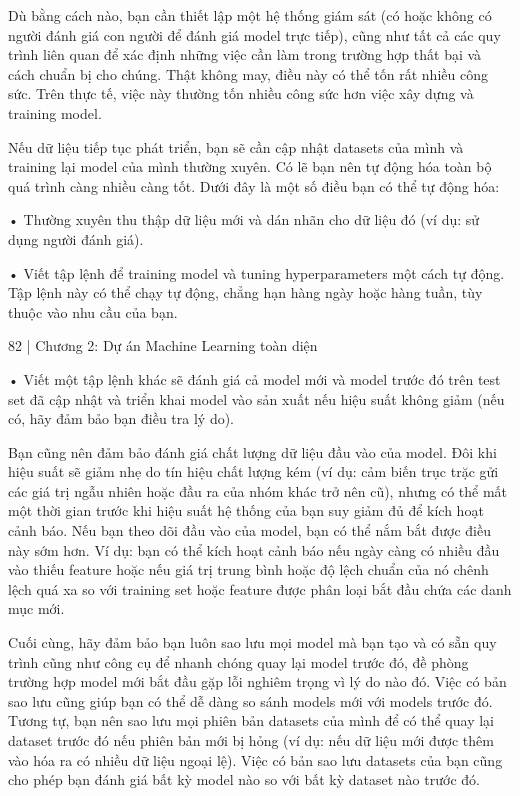 Dù bằng cách nào, bạn cần thiết lập một hệ thống giám sát (có hoặc không có người đánh giá con người để đánh giá model trực tiếp), cũng như tất cả các quy trình liên quan để xác định những việc cần làm trong trường hợp thất bại và cách chuẩn bị cho chúng. Thật không may, điều này có thể tốn rất nhiều công sức. Trên thực tế, việc này thường tốn nhiều công sức hơn việc xây dựng và training model.

Nếu dữ liệu tiếp tục phát triển, bạn sẽ cần cập nhật datasets của mình và training lại model của mình thường xuyên. Có lẽ bạn nên tự động hóa toàn bộ quá trình càng nhiều càng tốt. Dưới đây là một số điều bạn có thể tự động hóa:

• Thường xuyên thu thập dữ liệu mới và dán nhãn cho dữ liệu đó (ví dụ: sử dụng người đánh giá).

• Viết tập lệnh để training model và tuning hyperparameters một cách tự động. Tập lệnh này có thể chạy tự động, chẳng hạn hàng ngày hoặc hàng tuần, tùy thuộc vào nhu cầu của bạn.

82 | Chương 2: Dự án Machine Learning toàn diện

• Viết một tập lệnh khác sẽ đánh giá cả model mới và model trước đó trên test set đã cập nhật và triển khai model vào sản xuất nếu hiệu suất không giảm (nếu có, hãy đảm bảo bạn điều tra lý do).

Bạn cũng nên đảm bảo đánh giá chất lượng dữ liệu đầu vào của model. Đôi khi hiệu suất sẽ giảm nhẹ do tín hiệu chất lượng kém (ví dụ: cảm biến trục trặc gửi các giá trị ngẫu nhiên hoặc đầu ra của nhóm khác trở nên cũ), nhưng có thể mất một thời gian trước khi hiệu suất hệ thống của bạn suy giảm đủ để kích hoạt cảnh báo. Nếu bạn theo dõi đầu vào của model, bạn có thể nắm bắt được điều này sớm hơn. Ví dụ: bạn có thể kích hoạt cảnh báo nếu ngày càng có nhiều đầu vào thiếu feature hoặc nếu giá trị trung bình hoặc độ lệch chuẩn của nó chênh lệch quá xa so với training set hoặc feature được phân loại bắt đầu chứa các danh mục mới.

Cuối cùng, hãy đảm bảo bạn luôn sao lưu mọi model mà bạn tạo và có sẵn quy trình cũng như công cụ để nhanh chóng quay lại model trước đó, đề phòng trường hợp model mới bắt đầu gặp lỗi nghiêm trọng vì lý do nào đó. Việc có bản sao lưu cũng giúp bạn có thể dễ dàng so sánh models mới với models trước đó. Tương tự, bạn nên sao lưu mọi phiên bản datasets của mình để có thể quay lại dataset trước đó nếu phiên bản mới bị hỏng (ví dụ: nếu dữ liệu mới được thêm vào hóa ra có nhiều dữ liệu ngoại lệ). Việc có bản sao lưu datasets của bạn cũng cho phép bạn đánh giá bất kỳ model nào so với bất kỳ dataset nào trước đó.

